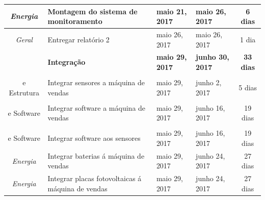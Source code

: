 \begin{longtable}{|c|m{6.5cm}|m{3.2cm}|m{3.2cm}|c|}
\textit{Energia}                                                          & Montagem do sistema de monitoramento                 & maio 21, 2017                        & maio 26, 2017                     & 6 dias                                \\ \hline
\textit{Geral}                                                            & Entregar relatório 2                                 & maio 26, 2017                        & maio 26, 2017                     & 1 dia                                 \\ \hline
\textit{}                                                                 & \textbf{Integração}                                  & \textbf{maio 29, 2017}               & \textbf{junho 30, 2017}           & \textbf{33 dias}                      \\ \hline
\textit{\begin{tabular}[c]{@{}c@{}}Eletrônica\\ e Estrutura\end{tabular}} & Integrar sensores a máquina de vendas                        & maio 29, 2017                        & junho 2, 2017                     & 5 dias                                \\ \hline
\textit{\begin{tabular}[c]{@{}c@{}}Eletrônica\\ e Software\end{tabular}}  & Integrar software a máquina de vendas                     & maio 29, 2017                        & junho 16, 2017                    & 19 dias                               \\ \hline
\textit{\begin{tabular}[c]{@{}c@{}}Eletrônica\\ e Software\end{tabular}}  & Integrar software aos sensores                       & maio 29, 2017                        & junho 16, 2017                    & 19 dias                               \\ \hline
\textit{Energia}                                                          & Integrar baterias á máquina de vendas                         & maio 29, 2017                        & junho 24, 2017                    & 27 dias                               \\ \hline
\textit{Energia}                                                          & Integrar placas fotovoltaicas á máquina de vendas            & maio 29, 2017                        & junho 24, 2017                    & 27 dias                               \\ \hline

\end{longtable}

